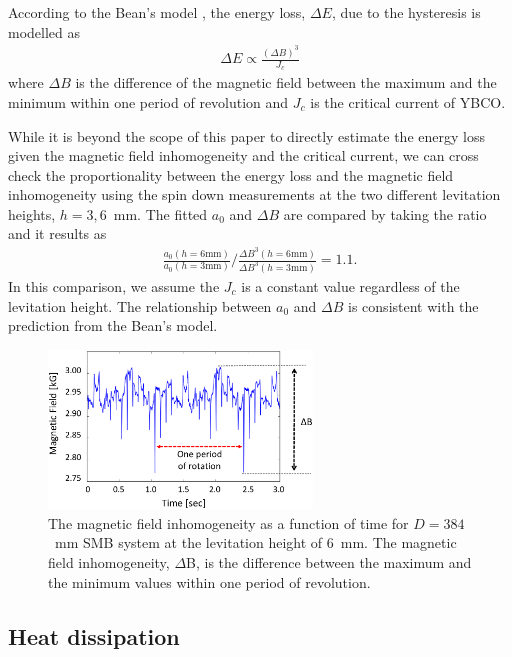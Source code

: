 \documentclass[iournal]{IEEEtran}
\begin{document}
According to the Bean's model \cite{beans_model_1,beans_model_2}, the energy loss, $\Delta E$, due to the hysteresis is modelled as
\begin{eqnarray}
\Delta E \propto \frac{(\Delta B)^3}{J_c}
\label{eq:bean}
\end{eqnarray}
where $\Delta B$ is the difference of the magnetic field between the maximum and the minimum within one period of revolution and $J_c$ is the critical current of YBCO.

While it is beyond the scope of this paper to directly estimate the energy loss given the magnetic field inhomogeneity and the critical current, we can cross check the proportionality between the energy loss and the magnetic field inhomogeneity using the spin down measurements at the two different levitation heights, $h=3, 6$~mm.
The fitted $a_0$ and $\Delta B$ are compared by taking the ratio and it results as
\begin{eqnarray}
\frac{a_0(h=6\mbox{mm})}{a_0(h=3\mbox{mm})} / \frac{\Delta B^3(h=6\mbox{mm})}{\Delta B^3(h=3\mbox{mm})} = 1.1.
\label{eq:beanmodelcheck}
\end{eqnarray}
In this comparison, we assume the $J_c$ is a constant value regardless of the levitation height.
The relationship between $a_0$ and $\Delta B$ is consistent with the prediction from the Bean's model.

\begin{figure}[htb]
   \centering
   \includegraphics[width=70mm]{magneticfieldvariation_rev2.eps} %
   \caption{The magnetic field inhomogeneity as a function of time for $D=384$~mm SMB system at the levitation height of 6~mm.
     The magnetic field inhomogeneity, $\Delta$B, is the difference between the maximum and the minimum values within one period of revolution.
}
   \label{fig:Bval}
\end{figure}

\subsection{Heat dissipation}
\end{document}
